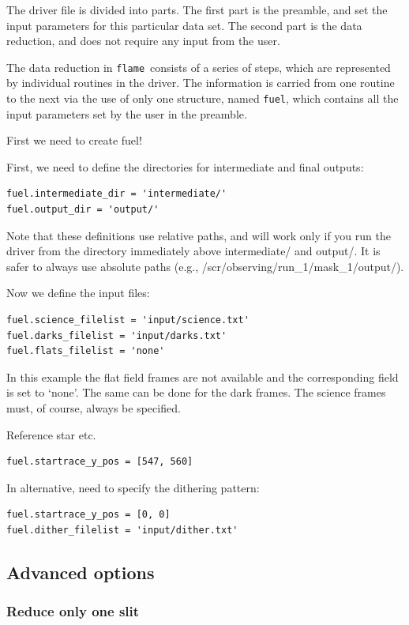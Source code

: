 \documentclass[a4paper, notitlepage]{article}
\newcommand{\flame}{\texttt{flame}}
\newcommand{\fuel}{\texttt{fuel}}
\begin{document}
The driver file is divided into parts. The first part is the preamble, and set the input parameters for this particular data set. The second part is the data reduction, and does not require any input from the user.

The data reduction in \flame\ consists of a series of steps, which are represented by individual routines in the driver. The information is carried from one routine to the next via the use of only one structure, named \fuel, which contains all the input parameters set by the user in the preamble.

First we need to create fuel!

First, we need to define the directories for intermediate and final outputs:
\begin{lstlisting}
fuel.intermediate_dir = 'intermediate/'
fuel.output_dir = 'output/'
\end{lstlisting}
Note that these definitions use relative paths, and will work only if you run the driver from the directory immediately above intermediate/ and output/. It is safer to always use absolute paths (e.g., /scr/observing/run\_1/mask\_1/output/).

Now we define the input files:
\begin{lstlisting}
fuel.science_filelist = 'input/science.txt'
fuel.darks_filelist = 'input/darks.txt'
fuel.flats_filelist = 'none'
\end{lstlisting}
In this example the flat field frames are not available and the corresponding field is set to \textquoteleft none\textquoteright. The same can be done for the dark frames. The science frames must, of course, always be specified.

Reference star etc.
\begin{lstlisting}
fuel.startrace_y_pos = [547, 560]
\end{lstlisting}

In alternative, need to specify the dithering pattern:
\begin{lstlisting}
fuel.startrace_y_pos = [0, 0]
fuel.dither_filelist = 'input/dither.txt'
\end{lstlisting}



\subsection{Advanced options}

\subsubsection{Reduce only one slit}
\end{document}
